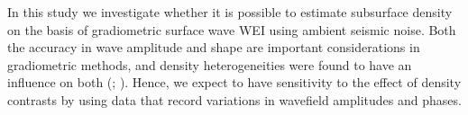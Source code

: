 \documentclass{article}
\begin{document}
	

	
	
	

	
	In this study we investigate whether it is possible to estimate subsurface density on the basis of gradiometric surface wave WEI using ambient seismic noise. Both the accuracy in wave amplitude and shape are important considerations in gradiometric methods, and density heterogeneities were found to have an influence on both (\cite{plonka2016imprint}; \cite{blom2017synthetic}). Hence, we expect to have sensitivity to the effect of density contrasts by using data that record variations in wavefield amplitudes and phases. \\
	
\end{document}

